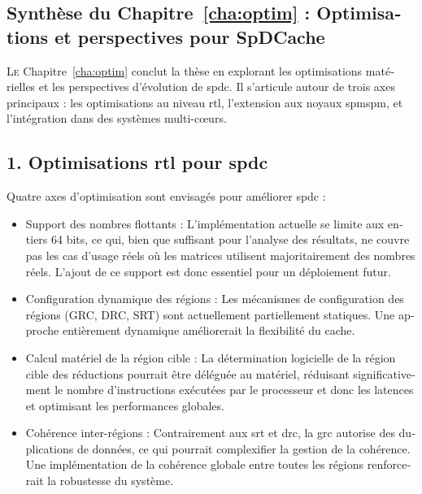 \begin{otherlanguage}{french}

\addtocounter{synthFCnt}{1}
\section{Synthèse du Chapitre~\ref{cha:optim} : Optimisations et perspectives pour SpDCache}

\lettrine{L}{e} Chapitre~\ref{cha:optim} conclut la thèse en explorant les optimisations matérielles et les perspectives d'évolution de \acrlong{spdc}.
Il s'articule autour de trois axes principaux : les optimisations au niveau \acrshort{rtl}, l'extension aux noyaux \acrshort{spmspm}, et l'intégration dans des systèmes multi-c\oe{}urs.

\subsection*{1. Optimisations \acrshort{rtl} pour \acrlong{spdc}}

Quatre axes d'optimisation sont envisagés pour améliorer \acrlong{spdc} :
\begin{itemize}
    \item Support des nombres flottants : L'implémentation actuelle se limite aux entiers 64 bits, ce qui, bien que suffisant pour l'analyse des résultats, ne couvre pas les cas d'usage réels où les matrices utilisent majoritairement des nombres réels.
    L'ajout de ce support est donc essentiel pour un déploiement futur.
    \item Configuration dynamique des régions : Les mécanismes de configuration des régions (GRC, DRC, SRT) sont actuellement partiellement statiques.
    Une approche entièrement dynamique améliorerait la flexibilité du cache.
    \item Calcul matériel de la région cible : La détermination logicielle de la région cible des réductions pourrait être déléguée au matériel, réduisant significativement le nombre d'instructions exécutées par le processeur et donc les latences et optimisant les performances globales.
    \item Cohérence inter-régions : Contrairement aux \acrshort{srt} et \acrshort{drc}, la \acrshort{grc} autorise des duplications de données, ce qui pourrait complexifier la gestion de la cohérence.
    Une implémentation de la cohérence globale entre toutes les régions renforcerait la robustesse du système.
\end{itemize}


\end{otherlanguage}
